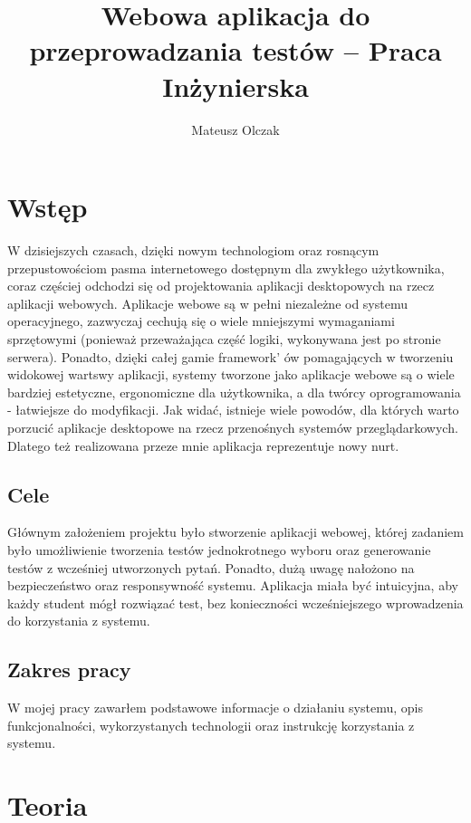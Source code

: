 \documentclass[a4paper, titlepage]{article}
\begin{document}
	\author{Mateusz Olczak}

	\title{Webowa aplikacja do przeprowadzania testów -- Praca Inżynierska}
	
	\maketitle
	\newpage


	\section{\textbf{Wstęp}}

	W dzisiejszych czasach, dzięki nowym technologiom oraz rosnącym przepustowościom pasma internetowego dostępnym dla zwykłego użytkownika, coraz częściej odchodzi się od projektowania aplikacji desktopowych na rzecz aplikacji webowych. Aplikacje webowe są w pełni niezależne od systemu operacyjnego, zazwyczaj cechują się o wiele mniejszymi wymaganiami sprzętowymi (ponieważ przeważająca część logiki, wykonywana jest po stronie serwera). Ponadto, dzięki całej gamie framework' ów pomagających w tworzeniu widokowej wartswy aplikacji, systemy tworzone jako aplikacje webowe są o wiele bardziej estetyczne, ergonomiczne dla użytkownika, a dla twórcy oprogramowania - łatwiejsze do modyfikacji. 
	Jak widać, istnieje wiele powodów, dla których warto porzucić aplikacje desktopowe na rzecz przenośnych systemów przeglądarkowych. Dlatego też realizowana przeze mnie aplikacja reprezentuje nowy nurt.
	

	\subsection{Cele}
	Głównym założeniem projektu było stworzenie aplikacji webowej, której zadaniem było umożliwienie tworzenia testów jednokrotnego wyboru oraz generowanie testów z wcześniej utworzonych pytań.
	Ponadto, dużą uwagę nałożono na bezpieczeństwo oraz responsywność systemu. Aplikacja miała być intuicyjna, aby każdy student mógł rozwiązać test, bez konieczności wcześniejszego wprowadzenia do korzystania z systemu. 
	\subsection{Zakres pracy}
	W mojej pracy zawarłem podstawowe informacje o działaniu systemu, opis funkcjonalności, wykorzystanych technologii oraz instrukcję korzystania z systemu.
	
	\section{\textbf{Teoria}}
\end{document}
